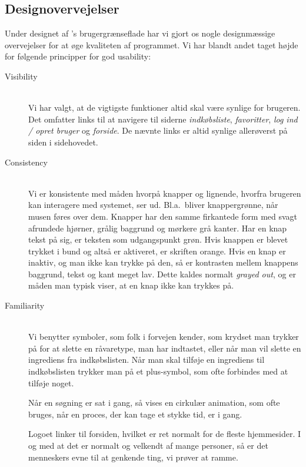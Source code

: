 \subsection{Designovervejelser}
\label{subsec:designovervejelser}

Under designet af \Foodl{}'s brugergrænseflade har vi gjort os nogle designmæssige overvejelser for at øge kvaliteten af programmet. Vi har blandt andet taget højde for følgende principper for god usability\cite[s.~90]{deb}:

\begin{description}
\item[Visibility] \hfill \\
Vi har valgt, at de vigtigste funktioner altid skal være synlige for brugeren. Det omfatter links til at navigere til siderne \textit{indkøbsliste}, \textit{favoritter}, \textit{log ind / opret bruger} og \textit{forside}. De nævnte links er altid synlige allerøverst på siden i sidehovedet.
 
\item[Consistency] \hfill \\
Vi er konsistente med måden hvorpå knapper og lignende, hvorfra brugeren kan interagere med systemet, ser ud. Bl.a.\ bliver knappergrønne, når musen føres over dem. Knapper har den samme firkantede form med svagt afrundede hjørner, grålig baggrund og mørkere grå kanter. Har en knap tekst på sig, er teksten som udgangspunkt grøn. Hvis knappen er blevet trykket i bund og altså er aktiveret, er skriften orange. Hvis en knap er inaktiv, og man ikke kan trykke på den, så er kontrasten mellem knappens baggrund, tekst og kant meget lav. Dette kaldes normalt \textit{grayed out}, og er måden man typisk viser, at en knap ikke kan trykkes på.

\item[Familiarity] \hfill \\
Vi benytter symboler, som folk i forvejen kender, som \fx krydset man trykker på for at slette en råvaretype, man har indtastet, eller når man vil slette en ingrediens fra indkøbslisten. Når man skal tilføje en ingrediens til indkøbslisten trykker man på et plus-symbol, som ofte forbindes med at tilføje noget.

Når en søgning er sat i gang, så vises en cirkulær animation, som ofte bruges, når en proces, der kan tage et stykke tid, er i gang.   

Logoet linker til forsiden, hvilket er ret normalt for de fleste hjemmesider. I og med at det er normalt og velkendt af mange personer, så er det menneskers evne til at genkende ting, vi prøver at ramme.


\end{description}

